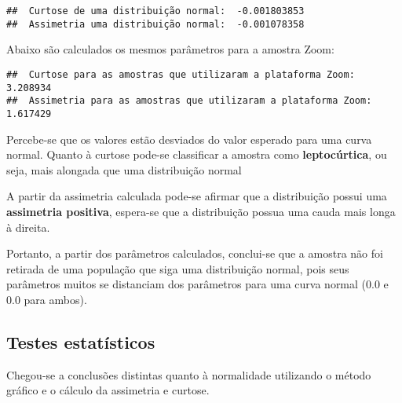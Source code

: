\documentclass[
]{article}
\newenvironment{Shaded}{\begin{snugshade}}{\end{snugshade}}
\newcommand{\CharTok}[1]{\textcolor[rgb]{0.31,0.60,0.02}{#1}}
\newcommand{\KeywordTok}[1]{\textcolor[rgb]{0.13,0.29,0.53}{\textbf{#1}}}
\newcommand{\NormalTok}[1]{#1}
\newcommand{\OperatorTok}[1]{\textcolor[rgb]{0.81,0.36,0.00}{\textbf{#1}}}
\newcommand{\StringTok}[1]{\textcolor[rgb]{0.31,0.60,0.02}{#1}}
\begin{document}
\begin{verbatim}
##  Curtose de uma distribuição normal:  -0.001803853 
##  Assimetria uma distribuição normal:  -0.001078358
\end{verbatim}

Abaixo são calculados os mesmos parâmetros para a amostra Zoom:

\begin{Shaded}
\end{Shaded}

\begin{verbatim}
##  Curtose para as amostras que utilizaram a plataforma Zoom:  3.208934 
##  Assimetria para as amostras que utilizaram a plataforma Zoom:  1.617429
\end{verbatim}

Percebe-se que os valores estão desviados do valor esperado para uma
curva normal. Quanto à curtose pode-se classificar a amostra como
\textbf{leptocúrtica}, ou seja, mais alongada que uma distribuição
normal

A partir da assimetria calculada pode-se afirmar que a distribuição
possui uma \textbf{assimetria positiva}, espera-se que a distribuição
possua uma cauda mais longa à direita.

Portanto, a partir dos parâmetros calculados, conclui-se que a amostra
não foi retirada de uma população que siga uma distribuição normal, pois
seus parâmetros muitos se distanciam dos parâmetros para uma curva
normal (0.0 e 0.0 para ambos).

\hypertarget{testes-estatuxedsticos}{%
\subsection{Testes estatísticos}\label{testes-estatuxedsticos}}

Chegou-se a conclusões distintas quanto à normalidade utilizando o
método gráfico e o cálculo da assimetria e curtose.
\end{document}
